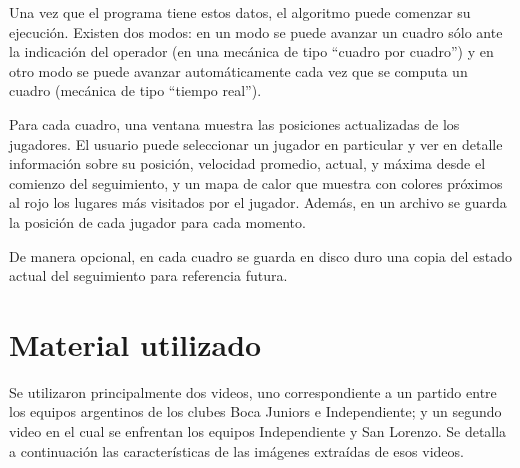 Una vez que el programa tiene estos datos, el algoritmo puede comenzar su
ejecución. Existen dos modos: en un modo se puede avanzar un cuadro sólo ante la
indicación del operador (en una mecánica de tipo ``cuadro por cuadro'') y en
otro modo se puede avanzar automáticamente cada vez que se computa un cuadro
(mecánica de tipo ``tiempo real'').

Para cada cuadro, una ventana muestra las posiciones actualizadas de los
jugadores. El usuario puede seleccionar un jugador en particular y ver en
detalle información sobre su posición, velocidad promedio, actual, y máxima
desde el comienzo del seguimiento, y un mapa de calor que muestra con colores
próximos al rojo los lugares más visitados por el jugador. Además, en un
archivo se guarda la posición de cada jugador para cada momento.

De manera opcional, en cada cuadro se guarda en disco duro una copia del estado
actual del seguimiento para referencia futura.

\section{Material utilizado}

Se utilizaron principalmente dos videos, uno correspondiente a un partido entre
los equipos argentinos de los clubes Boca Juniors e Independiente; y un segundo
video en el cual se enfrentan los equipos Independiente y San Lorenzo. Se
detalla a continuación las características de las imágenes extraídas de esos
videos.

